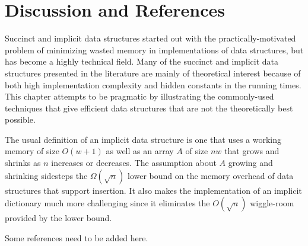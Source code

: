 \section{Discussion and References}

Succinct and implicit data structures started out with the
practically-motivated problem of minimizing wasted memory in
implementations of data structures, but has become a highly technical
field.  Many of the succinct and implicit data structures presented in
the literature are mainly of theoretical interest because of both high
implementation complexity and hidden constants in the running times.
This chapter attempts to be pragmatic by illustrating the commonly-used
techniques that give efficient data structures that are not the
theoretically best possible.

The usual definition of an implicit data structure is one that uses a
working memory of size $O(w+1)$ as well as an array $A$ of size $nw$ that
grows and shrinks as $n$ increases or decreases.  The assumption about $A$
growing and shrinking sidesteps the $\Omega(\sqrt{n})$ lower bound on the
memory overhead of data structures that support insertion.  It also makes
the implementation of an implicit dictionary much more challenging since it
eliminates the $O(\sqrt{n})$ wiggle-room provided by the lower bound.

Some references need to be added here.

%
%
%
%
%
%
%
